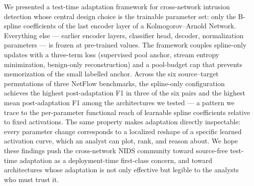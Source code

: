 \documentclass[10pt, conference, letterpaper]{IEEEtran}
\begin{document}
We presented a test-time adaptation framework for cross-network intrusion detection whose central design choice is the trainable parameter set: only the B-spline coefficients of the last encoder layer of a Kolmogorov--Arnold Network. Everything else --- earlier encoder layers, classifier head, decoder, normalization parameters --- is frozen at pre-trained values. The framework couples spline-only updates with a three-term loss (supervised pool anchor, stream entropy minimization, benign-only reconstruction) and a pool-budget cap that prevents memorization of the small labelled anchor. Across the six source--target permutations of three NetFlow benchmarks, the spline-only configuration achieves the highest post-adaptation F1 in three of the six pairs and the highest mean post-adaptation F1 among the architectures we tested --- a pattern we trace to the per-parameter functional reach of learnable spline coefficients relative to fixed activations. The same property makes adaptation directly inspectable: every parameter change corresponds to a localized reshape of a specific learned activation curve, which an analyst can plot, rank, and reason about. We hope these findings push the cross-network NIDS community toward source-free test-time adaptation as a deployment-time first-class concern, and toward architectures whose adaptation is not only effective but legible to the analysts who must trust it.




\end{document}
